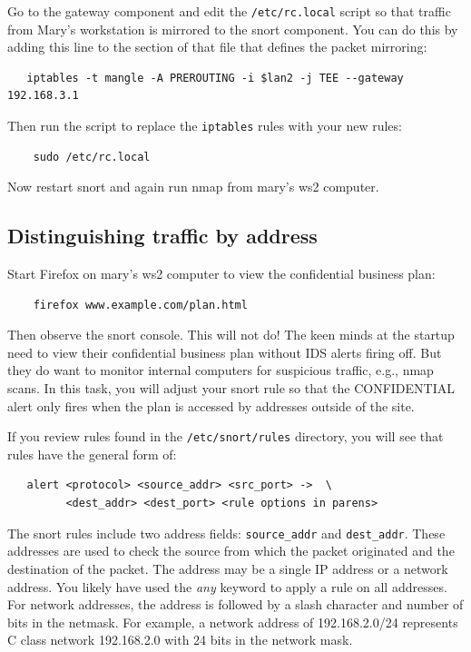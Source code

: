 Go to the gateway component and edit the {\tt /etc/rc.local} script so that traffic
from Mary's workstation is mirrored to the snort component.  You can do this by adding
this line to the section of that file that defines the packet mirroring:
\begin{verbatim}
   iptables -t mangle -A PREROUTING -i $lan2 -j TEE --gateway 192.168.3.1
\end{verbatim}

Then run the script to replace the {\tt iptables} rules with your new rules:
\begin{verbatim}
    sudo /etc/rc.local
\end{verbatim}
Now restart snort and again run nmap from mary's ws2 computer.


\subsection{Distinguishing traffic by address}
Start Firefox on mary's ws2 computer to view the confidential business plan:
\begin {verbatim}
    firefox www.example.com/plan.html
\end {verbatim}
Then observe the snort console.  This will not do!  The keen minds at the startup need to view their confidential
business plan without IDS alerts firing off.  But they do want to monitor
internal computers for suspicious traffic, e.g., nmap scans.  In this task, you 
will adjust your snort rule so that the CONFIDENTIAL alert only fires when the plan 
is accessed by addresses outside of
the site.  

If you review rules found in the {\tt/etc/snort/rules} directory, you will see that rules
have the general form of:
\begin{verbatim}
   alert <protocol> <source_addr> <src_port> ->  \
         <dest_addr> <dest_port> <rule options in parens>
\end{verbatim}

The snort rules include two address fields: {\tt source\_addr} and {\tt dest\_addr}. 
These addresses are used to check the
source from which the packet originated and the destination of the packet. The address
may be a single IP address or a network address. You likely have used the \textit{any} keyword to apply a
rule on all addresses. For network addresses, the address is followed by a slash character 
and number of bits in the netmask. For example, a network address of 192.168.2.0/24 
represents C class network 192.168.2.0 with 24 bits in the network mask.

